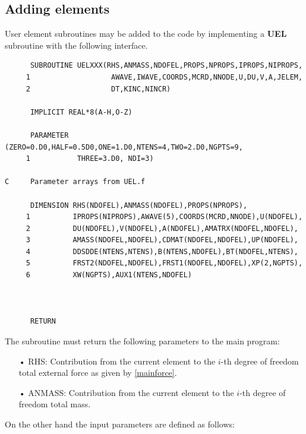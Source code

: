 \documentclass[12pt,letterpaper]{article}
\begin{document}
\subsection{Adding elements}
User element subroutines may be added to the code by implementing a {\bf UEL} subroutine with the following interface.


\begin{verbatim}
      SUBROUTINE UELXXX(RHS,ANMASS,NDOFEL,PROPS,NPROPS,IPROPS,NIPROPS,
     1                   AWAVE,IWAVE,COORDS,MCRD,NNODE,U,DU,V,A,JELEM,
     2                   DT,KINC,NINCR)
     
      IMPLICIT REAL*8(A-H,O-Z)

      PARAMETER (ZERO=0.D0,HALF=0.5D0,ONE=1.D0,NTENS=4,TWO=2.D0,NGPTS=9,
     1           THREE=3.D0, NDI=3)

C     Parameter arrays from UEL.f

      DIMENSION RHS(NDOFEL),ANMASS(NDOFEL),PROPS(NPROPS),
     1          IPROPS(NIPROPS),AWAVE(5),COORDS(MCRD,NNODE),U(NDOFEL),
     2          DU(NDOFEL),V(NDOFEL),A(NDOFEL),AMATRX(NDOFEL,NDOFEL),
     3          AMASS(NDOFEL,NDOFEL),CDMAT(NDOFEL,NDOFEL),UP(NDOFEL),
     4          DDSDDE(NTENS,NTENS),B(NTENS,NDOFEL),BT(NDOFEL,NTENS),
     5          FRST2(NDOFEL,NDOFEL),FRST1(NDOFEL,NDOFEL),XP(2,NGPTS),
     6          XW(NGPTS),AUX1(NTENS,NDOFEL)



      RETURN
\end{verbatim}
The subroutine must return the following parameters to the main program:

\begin{itemize}
\item[•] RHS: Contribution from the current element to the $i$-th degree of freedom total external force as given by \cref{mainforce}.
\item[•] ANMASS: Contribution from the current element to the $i$-th degree of freedom total mass. 
\end{itemize}

On the other hand the input parameters are defined as follows:
\end{document}
